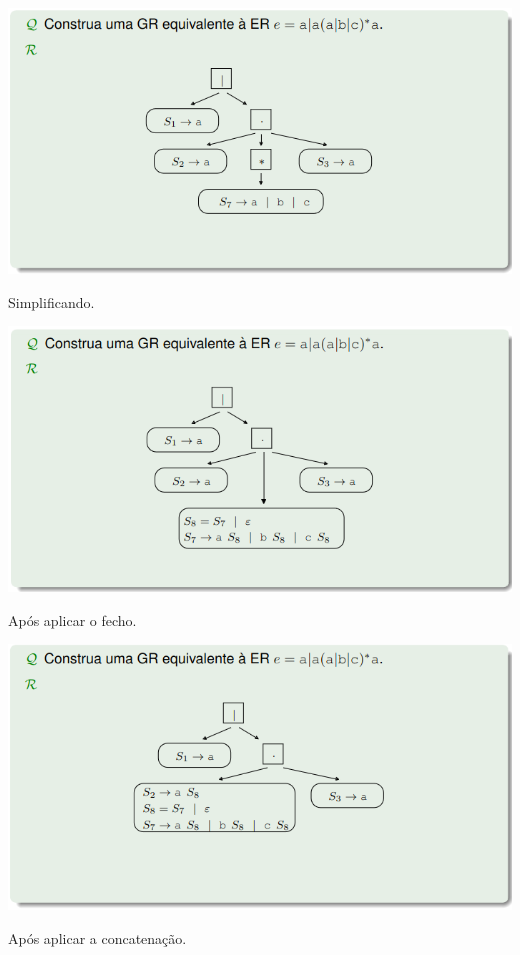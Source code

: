 \documentclass{article}
\begin{document}
\begin{flushleft}
  \pagebreak

  \begin{center}
    \includegraphics[scale=0.4]{17}
  \end{center}
  \item Simplificando.
  
  \begin{center}
    \includegraphics[scale=0.4]{18}
  \end{center}
  \item Após aplicar o fecho.

  \begin{center}
    \includegraphics[scale=0.4]{19}
  \end{center}
  \item Após aplicar a concatenação.


\end{flushleft}
\end{document}
